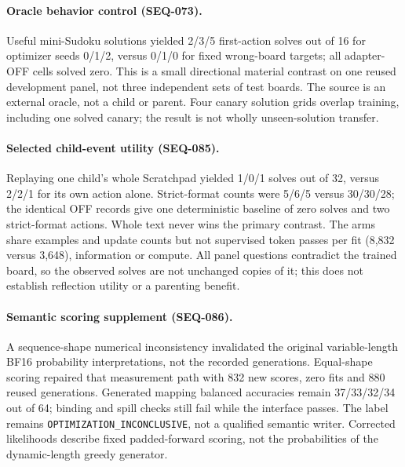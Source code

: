 \documentclass{article}
\begin{document}
\paragraph{Oracle behavior control (SEQ-073).} Useful mini-Sudoku solutions yielded 2/3/5 first-action solves out of 16 for optimizer seeds 0/1/2, versus 0/1/0 for fixed wrong-board targets; all adapter-OFF cells solved zero. This is a small directional material contrast on one reused development panel, not three independent sets of test boards. The source is an external oracle, not a child or parent. Four canary solution grids overlap training, including one solved canary; the result is not wholly unseen-solution transfer.

\paragraph{Selected child-event utility (SEQ-085).} Replaying one child's whole Scratchpad yielded 1/0/1 solves out of 32, versus 2/2/1 for its own action alone. Strict-format counts were 5/6/5 versus 30/30/28; the identical OFF records give one deterministic baseline of zero solves and two strict-format actions. Whole text never wins the primary contrast. The arms share examples and update counts but not supervised token passes per fit (8,832 versus 3,648), information or compute. All panel questions contradict the trained board, so the observed solves are not unchanged copies of it; this does not establish reflection utility or a parenting benefit.

\paragraph{Semantic scoring supplement (SEQ-086).} A sequence-shape numerical inconsistency invalidated the original variable-length BF16 probability interpretations, not the recorded generations. Equal-shape scoring repaired that measurement path with 832 new scores, zero fits and 880 reused generations. Generated mapping balanced accuracies remain 37/33/32/34 out of 64; binding and spill checks still fail while the interface passes. The label remains \texttt{OPTIMIZATION\_INCONCLUSIVE}, not a qualified semantic writer. Corrected likelihoods describe fixed padded-forward scoring, not the probabilities of the dynamic-length greedy generator.
\end{document}

